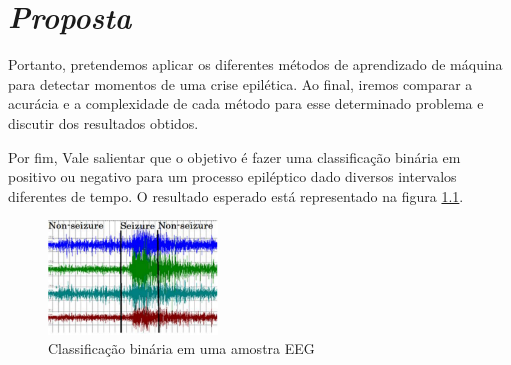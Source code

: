 \chapter{\textit{Proposta}}\label{chp:proposta}

Portanto, pretendemos aplicar os diferentes métodos de aprendizado de máquina para detectar momentos de uma crise epilética. Ao final, iremos comparar a acurácia e a complexidade de cada método para esse determinado problema e discutir dos resultados obtidos.

Por fim, Vale salientar que o objetivo é fazer uma classificação binária em positivo ou negativo para um processo epiléptico dado diversos intervalos diferentes de tempo. O resultado esperado está representado na figura \ref{fig:binary_class}.

\begin{figure}[!h]
    \centering
    \includegraphics[width=0.4\textwidth]{figuras/binary_class.png}
    \caption{Classificação binária em uma amostra EEG}
    \label{fig:binary_class}
\end{figure}
